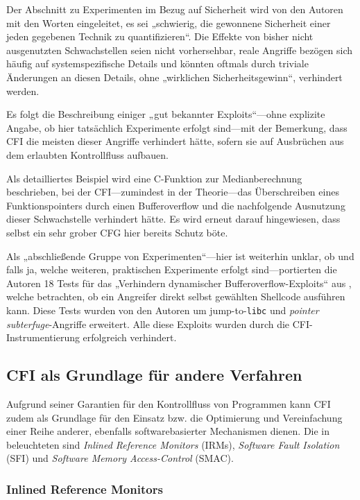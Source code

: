 \documentclass[11pt]{article}
\begin{document}
Der Abschnitt zu Experimenten im Bezug auf Sicherheit wird von den Autoren mit
den Worten eingeleitet, es sei „schwierig, die gewonnene Sicherheit einer jeden
gegebenen Technik zu quantifizieren“. Die Effekte von bisher nicht ausgenutzten
Schwachstellen seien nicht vorhersehbar, reale Angriffe bezögen sich häufig auf
systemspezifische Details und könnten oftmals durch triviale Änderungen an
diesen Details, ohne „wirklichen Sicherheitsgewinn“, verhindert werden.

Es folgt die Beschreibung einiger „gut bekannter Exploits“—ohne explizite
Angabe, ob hier tatsächlich Experimente erfolgt sind—mit der Bemerkung, dass
CFI die meisten dieser Angriffe verhindert hätte, sofern sie auf Ausbrüchen aus
dem erlaubten Kontrollfluss aufbauen.

Als detailliertes Beispiel wird eine C-Funktion zur Medianberechnung
beschrieben, bei der CFI—zumindest in der Theorie—das Überschreiben eines
Funktionspointers durch einen Bufferoverflow und die nachfolgende Ausnutzung
dieser Schwachstelle verhindert hätte. Es wird erneut darauf hingewiesen, dass
selbst ein sehr grober CFG hier bereits Schutz böte.

Als „abschließende Gruppe von Experimenten“—hier ist weiterhin unklar, ob und
falls ja, welche weiteren, praktischen Experimente erfolgt sind—portierten die
Autoren 18 Tests für das „Verhindern dynamischer Bufferoverflow-Exploits“ aus
\cite{wilander2003comparison}, welche betrachten, ob ein Angreifer direkt
selbst gewählten Shellcode ausführen kann. Diese Tests wurden von den Autoren
um jump-to-\texttt{libc} und \emph{pointer subterfuge}-Angriffe erweitert. Alle
diese Exploits wurden durch die CFI-Instrumentierung erfolgreich verhindert.

\subsection{CFI als Grundlage für andere Verfahren}

Aufgrund seiner Garantien für den Kontrollfluss von Programmen kann CFI zudem
als Grundlage für den Einsatz bzw. die Optimierung und Vereinfachung einer
Reihe anderer, ebenfalls softwarebasierter Mechanismen dienen. Die in
\cite{abadi-2009-control-tissec} beleuchteten sind \emph{Inlined Reference
Monitors} (IRMs), \emph{Software Fault Isolation} (SFI) und \emph{Software
Memory Access-Control} (SMAC).

\subsubsection{Inlined Reference Monitors}
\end{document}
